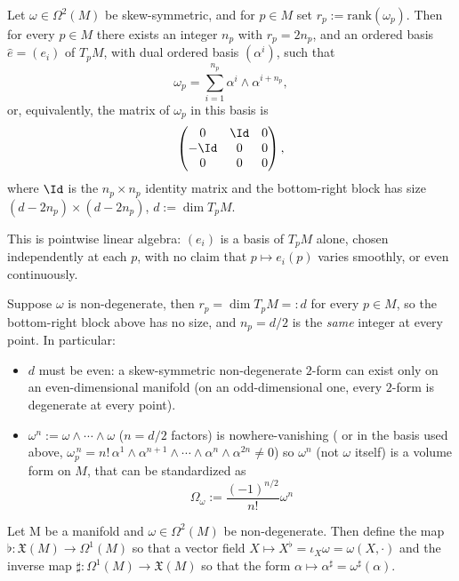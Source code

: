 \begin{proposition}\label{prop:skew-normal-form-manifold}
	Let $\omega \in \Omega^2(M)$ be skew-symmetric, and for $p \in M$ set $r_p := \mathrm{rank}(\omega_p)$. Then for every $p \in M$ there exists an integer $n_p$ with $r_p = 2n_p$, and an ordered basis $\hat e = (e_i)$ of $T_pM$, with dual ordered basis $(\alpha^i)$, such that
	\[
	\omega_p = \sum_{i=1}^{n_p} \alpha^i \wedge \alpha^{i+n_p},
	\]
	or, equivalently, the matrix of $\omega_p$ in this basis is
	\[
	\begin{pmatrix}
		0 & \Id & 0 \\
		-\Id & 0 & 0 \\
		0 & 0 & 0
	\end{pmatrix},
	\]
	where $\Id$ is the $n_p \times n_p$ identity matrix and the bottom-right block has size $(d-2n_p)\times(d-2n_p)$, $d := \dim T_pM$.
\end{proposition}

\begin{remark}
	This is pointwise linear algebra: $(e_i)$ is a basis of $T_pM$ alone, chosen independently at each $p$, with no claim that $p \mapsto e_i(p)$ varies smoothly, or even continuously.
\end{remark}

\begin{corollary}
	Suppose $\omega$ is non-degenerate, then $r_p = \dim T_pM =: d$ for every $p \in M$, so the bottom-right block above has no size, and $n_p = d/2$ is the \emph{same} integer at every point. In particular:
	\begin{itemize}
		\item $d$ must be even: a skew-symmetric non-degenerate $2$-form can exist only on an even-dimensional manifold (on an odd-dimensional one, every $2$-form is degenerate at every point).
		\item $\omega^n := \omega \wedge \cdots \wedge \omega$ ($n=d/2$ factors) is nowhere-vanishing ( or in the basis used above, $\omega_p^{\,n} = n!\,\alpha^1\wedge\alpha^{n+1}\wedge\cdots\wedge\alpha^n\wedge\alpha^{2n} \neq 0$) so $\omega^n$ (not $\omega$ itself) is a volume form on $M$, that can be standardized as
		\[
			\Omega_\omega := \frac{(-1)^{n/2}}{n!} \omega^n
		\]
	\end{itemize}
\end{corollary}

\begin{definition}\label{def:musical}
	Let M be a manifold and $\omega \in \Omega^2(M)$ be non-degenerate. Then define the map $\flat :\mathfrak{X}(M) \to \Omega^1(M)$ so that a vector field $X \mapsto X^\flat = \iota_X\omega = \omega(X, \cdot)$ and the inverse map $\sharp: \Omega^1(M) \to \mathfrak{X}(M)$ so that the form $\alpha \mapsto \alpha^\sharp = \omega^\sharp(\alpha)$.
\end{definition}

